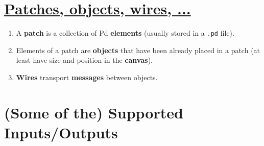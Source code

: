 \section{\href{http://puredata.info/docs/developer/PdFileFormat}{Patches, objects, wires, ...}}

\begin{enumerate}
\item A {\bf patch} is a collection of Pd {\bf elements} (usually
  stored in a {\tt .pd} file).
\item Elements of a patch are {\bf objects} that have been already
  placed in a patch (at least have size and position in the {\bf
    canvas}).
\item {\bf Wires} transport {\bf messages} between objects.
\end{enumerate}


\section{(Some of the) Supported Inputs/Outputs}

